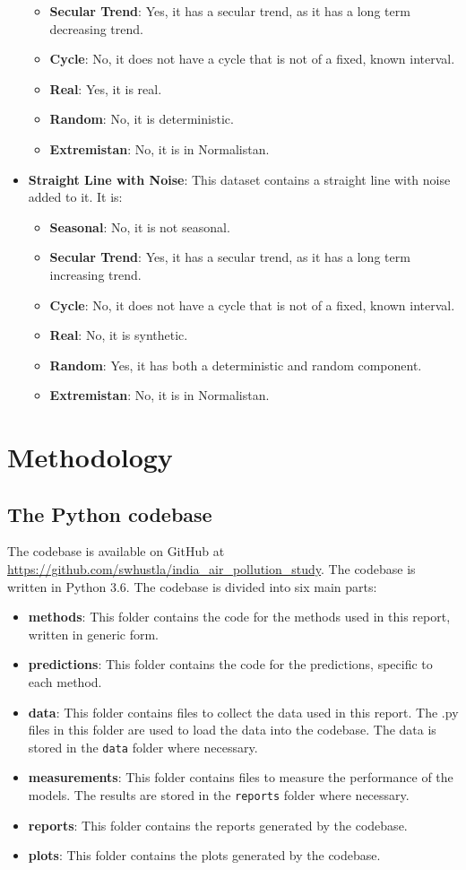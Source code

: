 \documentclass[manuscript,screen,nonacm,11pt]{acmart}
\numberwithin{equation}{section}
\begin{document}
\begin{itemize}
\begin{itemize}
	\item \textbf{Secular Trend}: Yes, it has a secular trend, as it has a long term decreasing trend.
	\item \textbf{Cycle}: No, it does not have a cycle that is not of a fixed, known interval.
	\item \textbf{Real}: Yes, it is real.
	\item \textbf{Random}: No, it is deterministic.
	\item \textbf{Extremistan}: No, it is in Normalistan.
\end{itemize}
\item \textbf{Straight Line with Noise}: This dataset contains a straight line with noise added to it. It is:
\begin {itemize}
	\item \textbf{Seasonal}: No, it is not seasonal.
	\item \textbf{Secular Trend}: Yes, it has a secular trend, as it has a long term increasing trend.
	\item \textbf{Cycle}: No, it does not have a cycle that is not of a fixed, known interval.
	\item \textbf{Real}: No, it is synthetic.
	\item \textbf{Random}: Yes, it has both a deterministic and random component.
	\item \textbf{Extremistan}: No, it is in Normalistan.
\end{itemize}
\end{itemize}
 
\section{Methodology}
\label{sec:methodology}
\subsection{The Python codebase}
\label{sec:codebase}
The codebase is available on GitHub at \url{https://github.com/swhustla/india_air_pollution_study}. 
The codebase is written in Python 3.6. The codebase is divided into six main parts:
\begin{itemize}
	\item \textbf{methods}: This folder contains the code for the methods used in this report, written in generic form.
	\item \textbf{predictions}: This folder contains the code for the predictions, specific to each method.
	\item \textbf{data}: This folder contains files to collect the data used in this report. The .py files in this folder are used to load the data into the codebase. The data is stored in the \texttt{data} folder where necessary.
	\item \textbf{measurements}: This folder contains files to measure the performance of the models. The results are stored in the \texttt{reports} folder where necessary.
	\item \textbf{reports}: This folder contains the reports generated by the codebase.
	\item \textbf{plots}: This folder contains the plots generated by the codebase.
\end{itemize}
\end{document}
